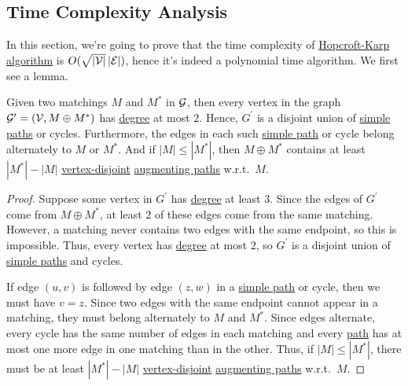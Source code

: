 \subsection{Time Complexity Analysis}
In this section, we're going to prove that the time complexity of \hyperref[algo:Hopcroft-Karp-algorithm]{Hopcroft-Karp algorithm} is \(O(\sqrt{\left\vert \mathcal{\MakeUppercase{V}}  \right\vert } \left\vert \mathcal{\MakeUppercase{e}}  \right\vert )\), hence it's indeed a polynomial time algorithm. We first see a lemma.

\begin{lemma}\label{lma:lec25-2}
	Given two matchings \(M\) and \(M^{\ast} \) in \(\mathcal{\MakeUppercase{g}} \), then every vertex in the graph \(\mathcal{\MakeUppercase{g}} ^\prime =(\mathcal{\MakeUppercase{v}} , M\oplus M^{\ast} )\) has \hyperref[def:degree]{degree} at most \(2\). Hence, \(G^\prime \) is a disjoint union of \hyperref[def:simple-path]{simple paths} or cycles. Furthermore, the edges in each such \hyperref[def:simple-path]{simple path} or cycle belong alternately to \(M\) or \(M^{\ast} \). And if \(\left\vert M \right\vert \leq \left\vert M^{\ast}  \right\vert \), then \(M\oplus M^{\ast} \) contains at least \(\left\vert M^{\ast}  \right\vert - \left\vert M \right\vert \) \hyperref[def:vertex-independent]{vertex-disjoint} \hyperref[def:augmenting-path]{augmenting paths} w.r.t.\ \(M\).
\end{lemma}
\begin{proof}
	Suppose some vertex in \(G^\prime \) has \hyperref[def:degree]{degree} at least \(3\). Since the edges of \(G^\prime \) come from \(M\oplus M^{\ast} \), at least \(2\) of these edges come from the same matching. However, a matching never contains two edges with the same endpoint, so this is impossible. Thus, every vertex has \hyperref[def:degree]{degree} at most \(2\), so \(G^\prime \) is a disjoint union of \hyperref[def:simple-path]{simple paths} and cycles.

	If edge \((u, v)\) is followed by edge \((z, w)\) in a \hyperref[def:simple-path]{simple path} or cycle, then we must have \(v=z\). Since two edges with the same endpoint cannot appear in a matching, they must belong alternately to \(M\) and \(M^{\ast} \). Since edges alternate, every cycle has the same number of edges in each matching and every \hyperref[def:path]{path} has at most one more edge in one matching than in the other. Thus, if \(\left\vert M \right\vert \leq \left\vert M^{\ast}  \right\vert \), there must be at least \(\left\vert M^{\ast} \right\vert - \left\vert M \right\vert \) \hyperref[def:vertex-independent]{vertex-disjoint} \hyperref[def:augmenting-path]{augmenting paths} w.r.t.\ \(M\).
\end{proof}

